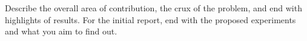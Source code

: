 Describe the overall area of contribution, the crux of the problem, 
and end with highlights of results. For the initial report, end with
the proposed experiments and what you aim to find out.
